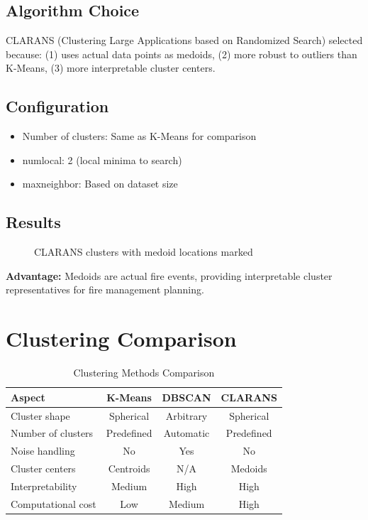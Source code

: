 \subsection*{Algorithm Choice}
CLARANS (Clustering Large Applications based on Randomized Search) selected because: (1) uses actual data points as medoids, (2) more robust to outliers than K-Means, (3) more interpretable cluster centers.

\subsection*{Configuration}
\begin{itemize}
    \item Number of clusters: Same as K-Means for comparison
    \item numlocal: 2 (local minima to search)
    \item maxneighbor: Based on dataset size
\end{itemize}

\subsection*{Results}
\begin{figure}[H]
    \centering
    \caption{CLARANS clusters with medoid locations marked}
    \label{fig:clarans_map}
\end{figure}

\textbf{Advantage:} Medoids are actual fire events, providing interpretable cluster representatives for fire management planning.

\section{Clustering Comparison}

\begin{table}[H]
\centering
\caption{Clustering Methods Comparison}
\label{tab:clustering_comparison}
\begin{tabular}{|l|c|c|c|}
\hline
\textbf{Aspect} & \textbf{K-Means} & \textbf{DBSCAN} & \textbf{CLARANS} \\
\hline
Cluster shape & Spherical & Arbitrary & Spherical \\
Number of clusters & Predefined & Automatic & Predefined \\
Noise handling & No & Yes & No \\
Cluster centers & Centroids & N/A & Medoids \\
Interpretability & Medium & High & High \\
Computational cost & Low & Medium & High \\
\hline
\end{tabular}
\end{table}

